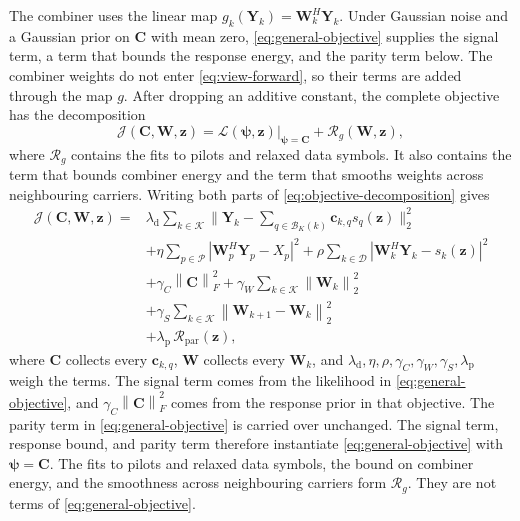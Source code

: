 \documentclass[conference]{IEEEtran}
\newcommand{\Kset}{\mathcal{K}}
\newcommand{\Pset}{\mathcal{P}}
\newcommand{\Dset}{\mathcal{D}}
\newcommand{\norm}[1]{\left\lVert #1\right\rVert}
\begin{document}
The combiner uses the linear map
\(g_k(\mathbf Y_k)=\mathbf W_k^H\mathbf Y_k\).  Under Gaussian noise and a
Gaussian prior on \(\mathbf C\) with mean zero,
\eqref{eq:general-objective} supplies the signal term, a term that bounds the
response energy, and the parity term below.  The combiner weights do not enter
\eqref{eq:view-forward}, so their terms are added through the map \(g\).
After dropping an additive constant, the complete objective has the
decomposition
\begin{equation}
  \mathcal J(\mathbf C,\mathbf W,\mathbf z)
  =
  \left.\mathcal L(\bm\psi,\mathbf z)\right|_{\bm\psi=\mathbf C}
  +\mathcal R_g(\mathbf W,\mathbf z),
  \label{eq:objective-decomposition}
\end{equation}
where \(\mathcal R_g\) contains the fits to pilots and relaxed data symbols.
It also contains the term that bounds combiner energy and the term that smooths
weights across neighbouring carriers.  Writing both parts of
\eqref{eq:objective-decomposition} gives
\begin{equation}
  \begin{aligned}
    \mathcal J(\mathbf C,\mathbf W,\mathbf z)
    ={}&\lambda_{\mathrm d}\sum_{k\in\Kset}
        \Big\|\mathbf Y_k-\sum_{q\in\mathcal B_K(k)}
        \mathbf c_{k,q}s_q(\mathbf z)\Big\|_2^2\\
    &+\eta\sum_{p\in\Pset}
      \left|\mathbf W_p^{H}\mathbf Y_p-X_p\right|^2
     +\rho\sum_{k\in\Dset}
      \left|\mathbf W_k^{H}\mathbf Y_k-s_k(\mathbf z)\right|^2\\
    &+\gamma_C\norm{\mathbf C}_F^2
     +\gamma_W\sum_{k\in\Kset}\norm{\mathbf W_k}_2^2\\
    &+\gamma_S\sum_{k\in\Kset}\norm{\mathbf W_{k+1}-\mathbf W_k}_2^2\\
    &+\lambda_{\mathrm p}\,\mathcal R_{\mathrm{par}}(\mathbf z),
  \end{aligned}
  \label{eq:joint-objective}
\end{equation}
where \(\mathbf C\) collects every \(\mathbf c_{k,q}\), \(\mathbf W\)
collects every \(\mathbf W_k\), and
\(\lambda_{\mathrm d},\eta,\rho,\gamma_C,\gamma_W,\gamma_S,
\lambda_{\mathrm p}\) weigh the terms.  The signal term comes from the
likelihood in \eqref{eq:general-objective}, and
\(\gamma_C\norm{\mathbf C}_F^2\) comes from the response prior in that
objective.  The parity term in \eqref{eq:general-objective} is carried over
unchanged.  The signal term, response bound, and parity term therefore
instantiate \eqref{eq:general-objective} with
\(\bm\psi=\mathbf C\).  The fits to pilots and relaxed data symbols, the bound
on combiner energy, and the smoothness across neighbouring carriers form
\(\mathcal R_g\).  They are not terms of \eqref{eq:general-objective}.
\end{document}
